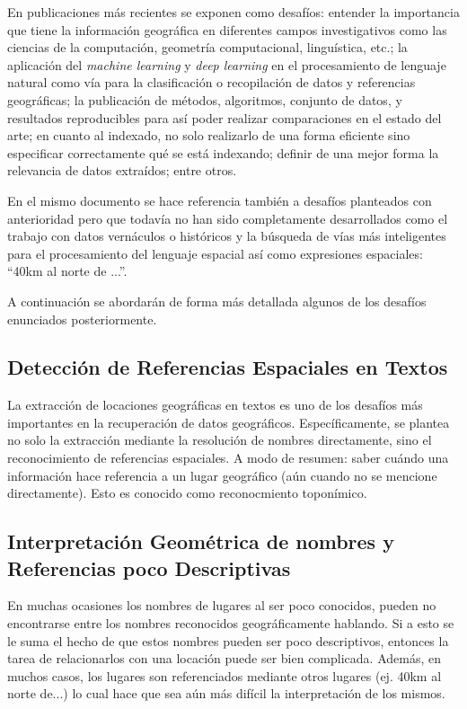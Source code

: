 \documentclass{llncs}
\begin{document}
En publicaciones más recientes \cite{purves2018} se exponen como desafíos:
entender la importancia que tiene la información geográfica en diferentes campos
investigativos como las ciencias de la computación, geometría computacional,
linguística, etc.; la aplicación del \emph{machine learning} y \emph{deep
learning} en el procesamiento de lenguaje natural como vía para la
clasificación o recopilación de datos y referencias geográficas; la publicación
de métodos, algoritmos, conjunto de datos, y resultados reproducibles para así
poder realizar comparaciones en el estado del arte; en cuanto al indexado, no
solo realizarlo de una forma eficiente sino especificar correctamente qué se
está indexando; definir de una mejor forma la relevancia de datos extraídos;
entre otros.

En el mismo documento se hace referencia también a desafíos planteados con
anterioridad pero que todavía no han sido completamente desarrollados como el
trabajo con datos vernáculos o históricos y la búsqueda de vías más
inteligentes para el procesamiento del lenguaje espacial así como expresiones
espaciales: ``40km al norte de ...''.

A continuación se abordarán de forma más detallada algunos de los
desafíos enunciados posteriormente.

\subsection{Detección de Referencias Espaciales en Textos}\label{sec:detect}

La extracción de locaciones geográficas en textos es uno de los desafíos más
importantes en la recuperación de datos geográficos. Específicamente, se plantea
no solo la extracción mediante la resolución de nombres directamente, sino
el reconocimiento de referencias espaciales. A modo de resumen: saber cuándo una
información hace referencia a un lugar geográfico (aún cuando no se mencione
directamente). Esto es conocido como reconocmiento toponímico.

\subsection{Interpretación Geométrica de nombres y Referencias poco
Descriptivas}\label{sec:geom}

En muchas ocasiones los nombres de lugares al ser poco conocidos, pueden no
encontrarse entre los nombres reconocidos geográficamente hablando. Si a esto
se le suma el hecho de que estos nombres pueden ser poco descriptivos, entonces
la tarea de relacionarlos con una locación puede ser bien complicada. Además,
en muchos casos, los lugares son referenciados mediante otros lugares (ej. 
40km al norte de...) lo cual hace que sea aún más difícil la interpretación de
los mismos.
\end{document}
